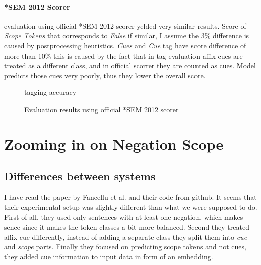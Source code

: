 \documentclass{article}
\begin{document}
\paragraph{*SEM 2012 Scorer} evaluation using official *SEM 2012 scorer yelded very similar results.
Score of \textit{Scope Tokens} that corresponds to \textit{False} if similar, I assume the 3\% difference
is caused by postprocessing heuristics. \textit{Cues} and \textit{Cue} tag have score difference of more
than 10\% this is caused by the fact that in tag evaluation affix cues are treated as a different class, and
in official scorrer they are counted as cues. Model predicts those cues very poorly, thus they lower the
overall score.
\begin{figure}[h]
\begin{subfigure}{0.45\textwidth}
    \centering
    \scalebox{0.8}{}
\end{subfigure}
\hfill
\begin{subfigure}{0.45\textwidth}
    \centering
    \scalebox{0.8}{}
\end{subfigure}
\caption{tagging accuracy}
\end{figure}

\begin{figure}[h]
\begin{subfigure}{\textwidth}
    \centering
    
    \vspace*{3mm}
\end{subfigure}
\begin{subfigure}{\textwidth}
    \centering
    
\end{subfigure}
\caption{Evaluation results using official *SEM 2012 scorer}
\end{figure}

\section{Zooming in on Negation Scope}
\subsection{Differences between systems}
I have read the paper by Fancellu et al. and their code from github. It seems that their
experimental setup was slightly different than what we were supposed to do. First of all,
they used only sentences with at least one negation, which makes sence since it makes the token
classes a bit more balanced. Second they treated affix cue differently, instead of adding
a separate class they split them into \textit{cue} and \textit{scope} parts. Finally they focused
on predicting scope tokens and not cues, they added cue information to input data in form of an embedding.
\end{document}
